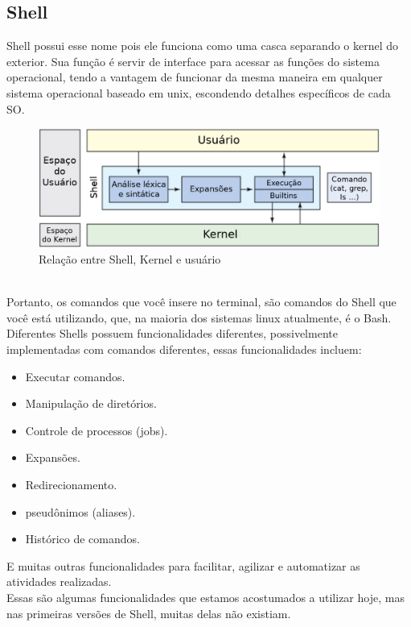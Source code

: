 \documentclass[twoside,twocolumn]{article}
\begin{document}
\subsection{Shell}
Shell possui esse nome pois ele funciona como uma casca separando o kernel do exterior. Sua função é servir de interface para acessar as funções do sistema operacional, tendo a vantagem de funcionar da mesma maneira em qualquer sistema operacional baseado em unix, escondendo detalhes específicos de cada SO.
\begin{figure}[h]
	\includegraphics[width=\linewidth]{shell_struct1.png}
	\caption{Relação entre Shell, Kernel e usuário}
	\label{fig:shellstruct}
\end{figure}\\
Portanto, os comandos que você insere no terminal, são comandos do Shell que você está utilizando, que, na maioria dos sistemas linux atualmente, é o Bash. Diferentes Shells possuem funcionalidades diferentes, possivelmente implementadas com comandos diferentes, essas funcionalidades incluem:
\begin{itemize}
	\item Executar comandos.
	\item Manipulação de diretórios.
	\item Controle de processos (jobs).
	\item Expansões.
	\item Redirecionamento.
	\item pseudônimos (aliases).
	\item Histórico de comandos.
\end{itemize}
E muitas outras funcionalidades para facilitar, agilizar e automatizar as atividades realizadas.\\
Essas são algumas funcionalidades que estamos acostumados a utilizar hoje, mas nas primeiras versões de Shell, muitas delas não existiam.
\end{document}
